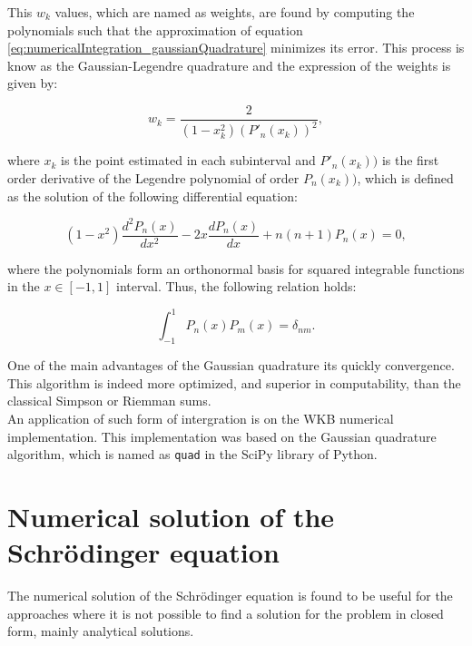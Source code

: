 \documentclass[openany]{book}
\begin{document}
This $w_k$ values, which are named as weights, are found by computing the polynomials such that the approximation of equation \ref{eq:numericalIntegration_gaussianQuadrature} minimizes its error. This process is know as the Gaussian-Legendre quadrature and the expression of the weights is given by: 

\begin{equation}\label{eq:numericalIntegration_gaussianQuadrature_weights}
	w_k = \frac{2}{(1 - x^2_k)(P'_n(x_k))^2},
\end{equation}

where $x_k$ is the point estimated in each subinterval and $P'_n(x_k))$ is the first order derivative of the Legendre polynomial of order $P_n(x_k))$, which is defined as the solution of the following differential equation: 

\begin{equation}\label{eq:numericalIntegration_gaussianQuadrature_Legendre_equation}
	(1 - x^2)\frac{d^2P_n(x)}{dx^2} - 2x\frac{dP_n(x)}{dx} + n(n+1)P_n(x) = 0,
\end{equation}

where the polynomials form an orthonormal basis for squared integrable functions in the $x \in [-1,1]$ interval. Thus, the following relation holds: 

\begin{equation}\label{eq:numericalIntegration_gaussianQuadrature_Legendre_normalization}
	\int_{-1}^{1} P_n(x) P_m(x) = \delta_{nm}. 
\end{equation}

One of the main advantages of the Gaussian quadrature its quickly convergence. This algorithm is indeed more optimized, and superior in computability, than the classical Simpson or Riemman sums. \\

An application of such form of intergration is on the WKB numerical implementation. This implementation was based on the Gaussian quadrature algorithm, which is named as \texttt{quad} in the SciPy library of Python. \\

\section{Numerical solution of the Schrödinger equation} \label{sec:schrodingerSolution}

The numerical solution of the Schrödinger equation is found to be useful for the approaches where it is not possible to find a solution for the problem in closed form, mainly analytical solutions.  \\ 
\end{document}
